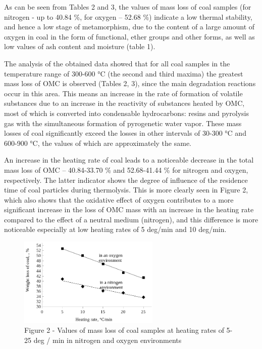 \begin{multicols}{2}
As can be seen from Tables 2 and 3, the values of mass loss of coal
samples (for nitrogen - up to 40.84 \%, for oxygen -- 52.68 \%) indicate
a low thermal stability, and hence a low stage of metamorphism, due to
the content of a large amount of oxygen in coal in the form of
functional, ether groups and other forms, as well as low values of ash
content and moisture (table 1).

The analysis of the obtained data showed that for all coal samples in
the temperature range of 300-600 °C (the second and third maxima) the
greatest mass loss of OMC is observed (Tables 2, 3), since the main
degradation reactions occur in this area. This means an increase in the
rate of formation of volatile substances due to an increase in the
reactivity of substances heated by OMC, most of which is converted into
condensable hydrocarbons: resins and pyrolysis gas with the simultaneous
formation of pyrogenetic water vapor. These mass losses of coal
significantly exceed the losses in other intervals of 30-300 °C and
600-900 °C, the values of which are approximately the same.

An increase in the heating rate of coal leads to a noticeable decrease
in the total mass loss of OMC -- 40.84-33.70 \% and 52.68-41.44 \% for
nitrogen and oxygen, respectively. The latter indicator shows the degree
of influence of the residence time of coal particles during thermolysis.
This is more clearly seen in Figure 2, which also shows that the
oxidative effect of oxygen contributes to a more significant increase in
the loss of OMC mass with an increase in the heating rate compared to
the effect of a neutral medium (nitrogen), and this difference is more
noticeable especially at low heating rates of 5 deg/min and 10 deg/min.
\end{multicols}

\begin{figure}[H]
	\centering
	\includegraphics[width=0.6\textwidth]{assets/1086}
	\caption*{Figure 2 - Values of mass loss of coal samples at heating rates of 5-25 deg / min in nitrogen and oxygen environments}
\end{figure}

